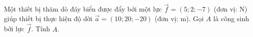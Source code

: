 \begin{bt}%
	Một thiết bị thăm dò đáy biển được đẩy bởi một lực $\overrightarrow{f}=(5; 2;-7)$ (đơn vị: N) giúp thiết bị thực hiện độ dời $\overrightarrow{a}=(10; 20;-20)$ (đơn vị: m). Gọi $A$ là công sinh bởi lực $\overrightarrow{f}$. Tính $A$.
\end{bt}


